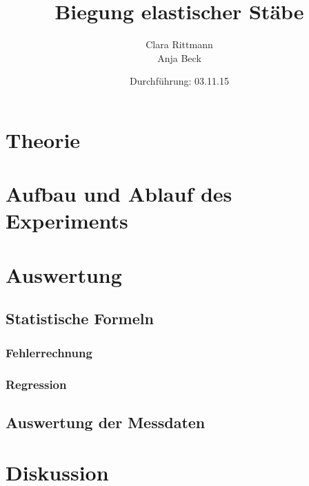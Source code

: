 \documentclass[a4,12pt]{article}
\title{Biegung elastischer Stäbe}
\author{Clara Rittmann \\ Anja Beck}
\date{Durchführung: 03.11.15}
\begin{document}
	\maketitle
	\date{}
\newpage
	\tableofcontents
\newpage

	\section{Theorie}
	
\newpage

	\section{Aufbau und Ablauf des Experiments}
	
\newpage

	\section{Auswertung}
	\subsection{Statistische Formeln}
	\subsubsection{Fehlerrechnung}
	
	\subsubsection{Regression}
	
	\subsection{Auswertung der Messdaten}
	
\newpage
	\section{Diskussion}
	
\end{document}
